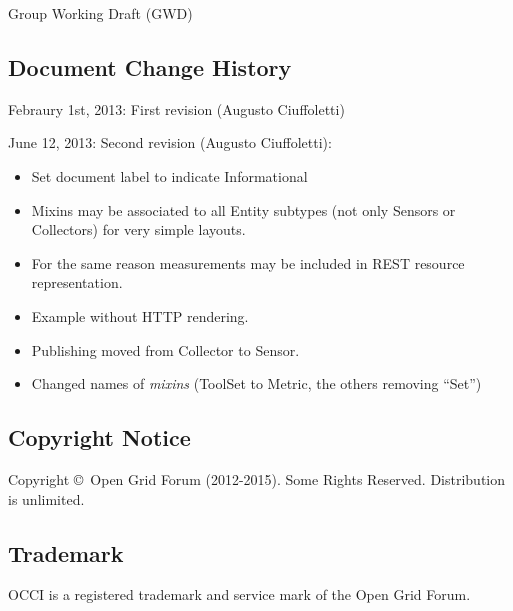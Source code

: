 \documentclass[12pt]{article}  %
\newcommand{\copyrightyears}{2012-2015}  %
\begin{document}
Group Working Draft (GWD)



\subsection*{Document Change History}

Febraury 1st, 2013: First revision (Augusto Ciuffoletti)

June 12, 2013: Second revision (Augusto Ciuffoletti):
\begin{itemize}
\item Set document label to indicate Informational
\item Mixins may be associated to all Entity subtypes (not only Sensors or Collectors) for very simple layouts. 
\item For the same reason measurements may be included in REST resource representation. 
\item Example without HTTP rendering. 
\item Publishing moved from Collector to Sensor.
\item Changed names of {\em mixins} (ToolSet to Metric, the others removing ``Set'')
\end{itemize}

\subsection*{Copyright Notice}

Copyright \copyright \ Open Grid Forum (\copyrightyears).  Some Rights Reserved.  
Distribution is unlimited.

\subsection*{Trademark}

OCCI is a registered trademark and service mark of the Open Grid Forum. 
\end{document}

